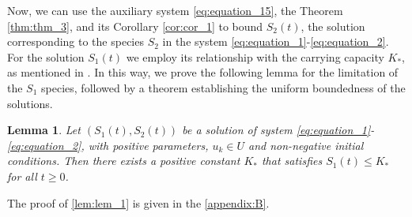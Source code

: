 \documentclass[10pt,letterpaper]{article}
\newtheorem{lemma}{Lemma}
\begin{document}
Now, we can use the auxiliary system \eqref{eq:equation_15}, the Theorem \eqref{thm:thm_3}, and its Corollary \eqref{cor:cor_1} to bound $S_2(t)$, the solution corresponding to the species $S_2$ in the system \eqref{eq:equation_1}-\eqref{eq:equation_2}. For the solution $S_1(t)$ we employ its relationship with the carrying capacity $K_*$, as mentioned in \cite{Campo2017}. In this way, we prove the following lemma for the limitation of the $S_1$ species, followed by a theorem establishing the uniform boundedness of the solutions.

\begin{lemma}\label{lem:lem_1}
    Let $(S_1(t),S_2(t))$ be a solution of system \eqref{eq:equation_1}-\eqref{eq:equation_2}, with positive parameters, $u_k \in U$ and non-negative initial conditions. Then there exists a positive constant $K_*$ that satisfies $S_1(t)\leq K_*$ for all $t \geq 0$.
\end{lemma}
The proof of \eqref{lem:lem_1} is given in the \eqref{appendix:B}.
\end{document}
